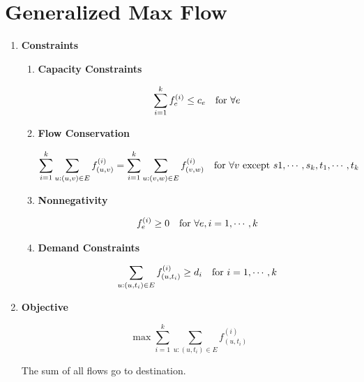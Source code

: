 \documentclass[11pt]{article}
\newenvironment{qparts}{\begin{enumerate}[{(}a{)}]}{\end{enumerate}}
\begin{document}
\section{Generalized Max Flow}
\begin{qparts}
	\item \textbf{Constraints}
	
	\renewcommand{\theenumii}{\roman{enumii}}
	\begin{enumerate}
		\item \textbf{Capacity Constraints}
		
		\[
			\sum_{i=1}^{k} f_e^{(i)} \le c_e \text{\quad for } \forall e
		\]
		
		\item \textbf{Flow Conservation}
		
		\[
			\sum_{i=1}^{k} \sum_{u:(u, v)\in E} f_{(u, v)}^{(i)}  = \sum_{i=1}^{k} \sum_{u:(v, w)\in E} f_{(v, w)}^{(i)} \text{\quad for } \forall v \text{ except }s1, \cdots, s_k, t_1, \cdots, t_k
		\]
		
		\item \textbf{Nonnegativity}
		
		\[
			 f_e^{(i)} \ge 0 \text{\quad for } \forall e, i = 1, \cdots, k
		\]
		
		\item \textbf{Demand Constraints}
		
		\[
			\sum_{u:(u, t_i)\in E} f_{(u, t_i)}^{(i)} \ge d_i \text{\quad for }  i = 1, \cdots, k
		\]
		
	\end{enumerate}


	\item \textbf{Objective}
	
	\[
		\max \sum_{i=1}^{k}\sum_{u:(u, t_i)\in E} f_{(u, t_i)}^{(i)}
	\]
	
	The sum of all flows go to destination.


\end{qparts}

\newpage
\end{document}
